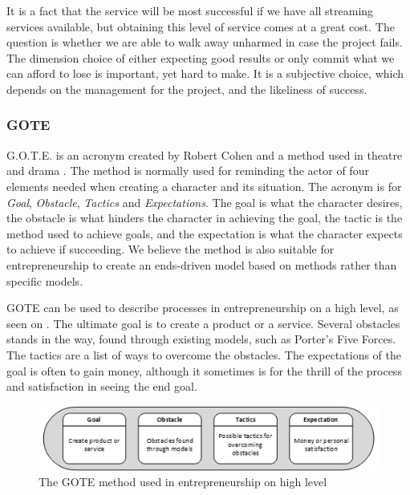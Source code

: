 It is a fact that the service will be most successful if we have all streaming services available, but obtaining this level of service comes at a great cost. The question is whether we are able to walk away unharmed in case the project fails. The dimension choice of either expecting good results or only commit what we can afford to lose is important, yet hard to make. It is a subjective choice, which depends on the management for the project, and the likeliness of success.

\subsubsection*{GOTE}
G.O.T.E. is an acronym created by Robert Cohen and a method used in theatre and drama \cite{gote}. The method is normally used for reminding the actor of four elements needed when creating a character and its situation. The acronym is for \emph{Goal}, \emph{Obstacle}, \emph{Tactics} and \emph{Expectations}. The goal is what the character desires, the obstacle is what hinders the character in achieving the goal, the tactic is the method used to achieve goals, and the expectation is what the character expects to achieve if succeeding. We believe the method is also suitable for entrepreneurship to create an ends-driven model based on methods rather than specific models.

GOTE can be used to describe processes in entrepreneurship on a high level, as seen on . The ultimate goal is to create a product or a service. Several obstacles stands in the way, found through existing models, such as Porter's Five Forces. The tactics are a list of ways to overcome the obstacles. The expectations of the goal is often to gain money, although it sometimes is for the thrill of the process and satisfaction in seeing the end goal.

\begin{figure}[h]
\begin{center}
\includegraphics[scale=1]{./pics/gote}
\caption{The GOTE method used in entrepreneurship on high level}
\label{fig:gote}
\end{center}
\end{figure}

